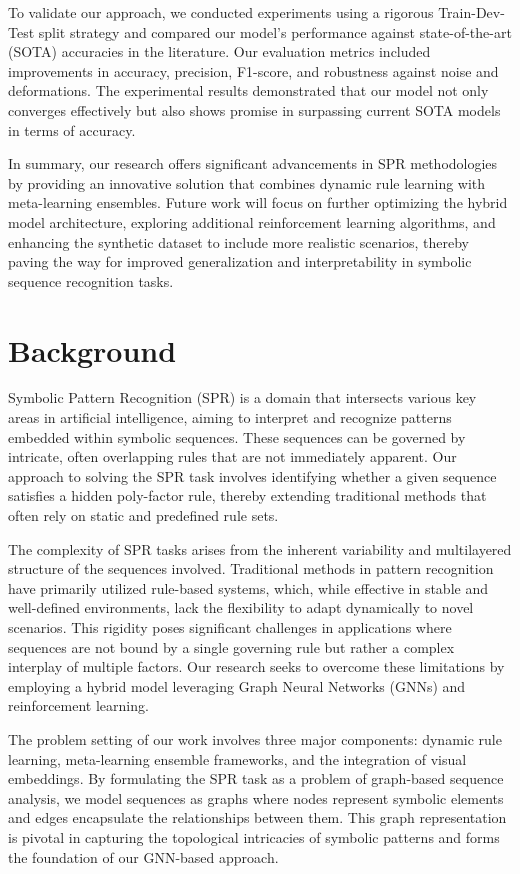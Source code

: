 \documentclass{article}
\begin{document}
To validate our approach, we conducted experiments using a rigorous Train-Dev-Test split strategy and compared our model's performance against state-of-the-art (SOTA) accuracies in the literature. Our evaluation metrics included improvements in accuracy, precision, F1-score, and robustness against noise and deformations. The experimental results demonstrated that our model not only converges effectively but also shows promise in surpassing current SOTA models in terms of accuracy.

In summary, our research offers significant advancements in SPR methodologies by providing an innovative solution that combines dynamic rule learning with meta-learning ensembles. Future work will focus on further optimizing the hybrid model architecture, exploring additional reinforcement learning algorithms, and enhancing the synthetic dataset to include more realistic scenarios, thereby paving the way for improved generalization and interpretability in symbolic sequence recognition tasks.

\section{Background}
Symbolic Pattern Recognition (SPR) is a domain that intersects various key areas in artificial intelligence, aiming to interpret and recognize patterns embedded within symbolic sequences. These sequences can be governed by intricate, often overlapping rules that are not immediately apparent. Our approach to solving the SPR task involves identifying whether a given sequence satisfies a hidden poly-factor rule, thereby extending traditional methods that often rely on static and predefined rule sets.

The complexity of SPR tasks arises from the inherent variability and multilayered structure of the sequences involved. Traditional methods in pattern recognition have primarily utilized rule-based systems, which, while effective in stable and well-defined environments, lack the flexibility to adapt dynamically to novel scenarios. This rigidity poses significant challenges in applications where sequences are not bound by a single governing rule but rather a complex interplay of multiple factors. Our research seeks to overcome these limitations by employing a hybrid model leveraging Graph Neural Networks (GNNs) and reinforcement learning.

The problem setting of our work involves three major components: dynamic rule learning, meta-learning ensemble frameworks, and the integration of visual embeddings. By formulating the SPR task as a problem of graph-based sequence analysis, we model sequences as graphs where nodes represent symbolic elements and edges encapsulate the relationships between them. This graph representation is pivotal in capturing the topological intricacies of symbolic patterns and forms the foundation of our GNN-based approach.
\end{document}
